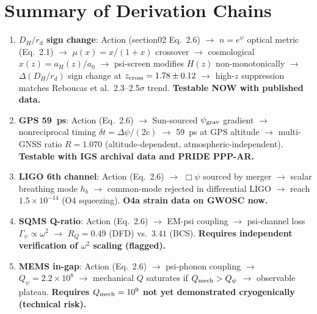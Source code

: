 \documentclass[11pt]{article}
\newcommand{\ee}[1]{\times 10^{#1}}
\newcommand{\Qpsi}{Q_\psi}
\begin{document}
\section*{Summary of Derivation Chains}

\begin{enumerate}
\item \textbf{$D_H/r_d$ sign change}: Action (section02 Eq.~2.6)
  $\to$ $n = e^\psi$ optical metric (Eq.~2.1) $\to$ $\mu(x) = x/(1+x)$
  crossover $\to$ cosmological $x(z) = a_H(z)/a_0$ $\to$ psi-screen
  modifies $H(z)$ non-monotonically $\to$ $\Delta(D_H/r_d)$ sign change
  at $z_{\rm cross} = 1.78 \pm 0.12$ $\to$ high-$z$ suppression
  matches Reboucas et al.\ 2.3--2.5$\sigma$ trend.
  \textbf{Testable NOW with published data.}

\item \textbf{GPS 59~ps}: Action (Eq.~2.6) $\to$ Sun-sourced
  $\psi_{\rm grav}$ gradient $\to$ nonreciprocal timing
  $\delta t = \Delta\psi / (2c)$ $\to$ 59~ps at GPS altitude $\to$
  multi-GNSS ratio $R = 1.070$ (altitude-dependent, atmospheric-independent).
  \textbf{Testable with IGS archival data and PRIDE PPP-AR.}

\item \textbf{LIGO 6th channel}: Action (Eq.~2.6) $\to$ $\Box\psi$
  sourced by merger $\to$ scalar breathing mode $h_b$ $\to$
  common-mode rejected in differential LIGO $\to$ reach $1.5\ee{-14}$
  (O4 squeezing). \textbf{O4a strain data on GWOSC now.}

\item \textbf{SQMS Q-ratio}: Action (Eq.~2.6) $\to$ EM-psi coupling
  $\to$ psi-channel loss $\Gamma_\psi \propto \omega^2$ $\to$
  $R_Q = 0.49$ (DFD) vs.\ $3.41$ (BCS). \textbf{Requires independent
  verification of $\omega^2$ scaling (flagged).}

\item \textbf{MEMS in-gap}: Action (Eq.~2.6) $\to$ psi-phonon coupling
  $\to$ $\Qpsi = 2.2\ee{8}$ $\to$ mechanical $Q$ saturates if
  $Q_{\rm mech} > \Qpsi$ $\to$ observable plateau.
  \textbf{Requires $Q_{\rm mech} = 10^9$ not yet demonstrated
  cryogenically (technical risk).}
\end{enumerate}
\end{document}

